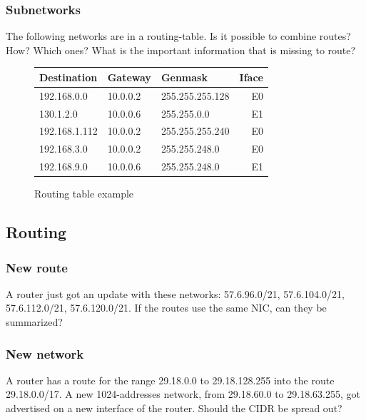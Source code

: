 \documentclass[11pt]{article}
\begin{document}
\subsubsection{Subnetworks}
The following networks are in a routing-table. Is it possible to combine routes? How? Which ones? What is the important information that is missing to route? %
\begin{figure}[h]
  \centering
  \resizebox{10cm}{!} {
    \begin{tabular}{lllr}
      \textbf{Destination} & \textbf{Gateway} & \textbf{Genmask} & \textbf{Iface} \\ \hline
      192.168.0.0   & 10.0.0.2 & 255.255.255.128 & E0 \\
      130.1.2.0     & 10.0.0.6 & 255.255.0.0     & E1 \\
      192.168.1.112 & 10.0.0.2 & 255.255.255.240 & E0 \\
      192.168.3.0   & 10.0.0.2 & 255.255.248.0   & E0 \\
      192.168.9.0   & 10.0.0.6 & 255.255.248.0   & E1 \\
    \end{tabular}
  }
  \caption{Routing table example}
  \label{fig:rting-tbl}
\end{figure}
\subsection{Routing}
\subsubsection{New route}
A router just got an update with these networks: 57.6.96.0/21, 57.6.104.0/21, 57.6.112.0/21, 57.6.120.0/21. If the routes use the same NIC, can they be summarized? %
\subsubsection{New network}
A router has a route for the range 29.18.0.0 to 29.18.128.255 into the route 29.18.0.0/17. A new 1024-addresses network, from 29.18.60.0 to 29.18.63.255, got advertised on a new interface of the router. Should the CIDR be spread out? %
\end{document}
